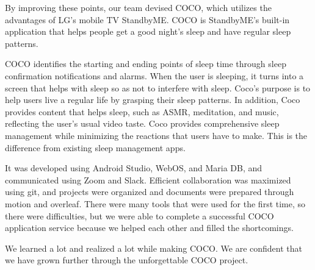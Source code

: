 \documentclass[conference]{IEEEtran}
\begin{document}
By improving these points, our team devised COCO, which utilizes the advantages of LG's mobile TV StandbyME. COCO is StandbyME's built-in application that helps people get a good night's sleep and have regular sleep patterns.

COCO identifies the starting and ending points of sleep time through sleep confirmation notifications and alarms. When the user is sleeping, it turns into a screen that helps with sleep so as not to interfere with sleep. Coco's purpose is to help users live a regular life by grasping their sleep patterns. In addition, Coco provides content that helps sleep, such as ASMR, meditation, and music, reflecting the user's usual video taste. Coco provides comprehensive sleep management while minimizing the reactions that users have to make. This is the difference from existing sleep management apps.

It was developed using Android Studio, WebOS, and Maria DB, and communicated using Zoom and Slack. Efficient collaboration was maximized using git, and projects were organized and documents were prepared through motion and overleaf. There were many tools that were used for the first time, so there were difficulties, but we were able to complete a successful COCO application service because we helped each other and filled the shortcomings.

We learned a lot and realized a lot while making COCO. We are confident that we have grown further through the unforgettable COCO project.

\clearpage
\thispagestyle{empty}

\listoftables
\vspace{2\baselineskip} 
\listoffigures

\newpage
{}
\end{document}
